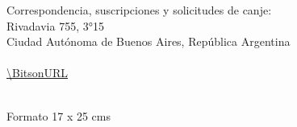 {\scriptsize{}Correspondencia, suscripciones y solicitudes de canje:}\\
{\scriptsize{} Rivadavia 755, 3°15 }\\
{\scriptsize{} Ciudad Autónoma de Buenos Aires, República Argentina}\\
{\scriptsize{} \BitsonCoop}\\
{\scriptsize{} \url{\BitsonURL}}\\
{\scriptsize{} \texttt{\BitsonMail}}\\
{\scriptsize \par}

{\scriptsize{}Formato 17 x 25 cms}\\
